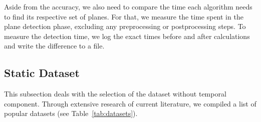 \documentclass[main.tex]{subfiles}
\begin{document}
Aside from the accuracy, we also need to compare the time each algorithm needs to find its respective set of planes.
For that, we measure the time spent in the plane detection phase, excluding any preprocessing or postprocessing steps.
To measure the detection time, we log the exact times before and after calculations and write the difference to a file.\\

\subsection{Static Dataset}
This subsection deals with the selection of the dataset without temporal component.
Through extensive research of current literature, we compiled a list of popular datasets (see Table~\ref{tab:datasets}). 
\end{document}
